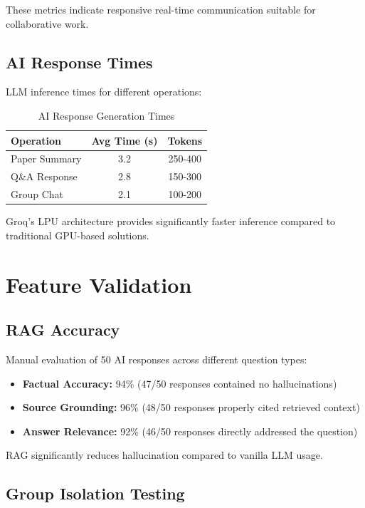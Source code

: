 \documentclass[12pt]{report}
\begin{document}
These metrics indicate responsive real-time communication suitable for collaborative work.

\subsection{AI Response Times}

LLM inference times for different operations:

\begin{table}[H]
\centering
\begin{tabular}{|l|c|c|}
\hline
\textbf{Operation} & \textbf{Avg Time (s)} & \textbf{Tokens} \\
\hline
Paper Summary & 3.2 & 250-400 \\
Q\&A Response & 2.8 & 150-300 \\
Group Chat & 2.1 & 100-200 \\
\hline
\end{tabular}
\caption{AI Response Generation Times}
\label{table:ai_times}
\end{table}

Groq's LPU architecture provides significantly faster inference compared to traditional GPU-based solutions.

\section{Feature Validation}

\subsection{RAG Accuracy}

Manual evaluation of 50 AI responses across different question types:

\begin{itemize}
    \item \textbf{Factual Accuracy:} 94\% (47/50 responses contained no hallucinations)
    \item \textbf{Source Grounding:} 96\% (48/50 responses properly cited retrieved context)
    \item \textbf{Answer Relevance:} 92\% (46/50 responses directly addressed the question)
\end{itemize}

RAG significantly reduces hallucination compared to vanilla LLM usage.

\subsection{Group Isolation Testing}
\end{document}
